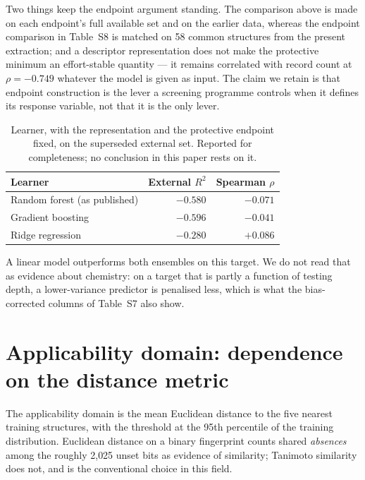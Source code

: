 \documentclass[11pt]{article}
\begin{document}
Two things keep the endpoint argument standing. The comparison above is made on
each endpoint's full available set and on the earlier data, whereas the endpoint
comparison in Table~S8 is matched on 58 common structures from the present
extraction; and a descriptor representation does not
make the protective minimum an effort-stable quantity --- it remains correlated
with record count at $\rho=-0.749$ whatever the model is given as input. The
claim we retain is that endpoint construction is the lever a screening programme
controls when it defines its response variable, not that it is the only lever.

\begin{table}[h]
\centering
\caption{Learner, with the representation and the protective endpoint fixed, on
the superseded external set. Reported for completeness; no conclusion in this
paper rests on it.}
\small
\begin{tabular}{lrr}
\toprule
Learner & External $R^2$ & Spearman $\rho$ \\
\midrule
Random forest (as published) & $-0.580$ & $-0.071$ \\
Gradient boosting & $-0.596$ & $-0.041$ \\
Ridge regression & $-0.280$ & $+0.086$ \\
\bottomrule
\end{tabular}
\end{table}

A linear model outperforms both ensembles on this target. We do not read that as
evidence about chemistry: on a target that is partly a function of testing
depth, a lower-variance predictor is penalised less, which is what the
bias-corrected columns of Table~S7 also show.

\section{Applicability domain: dependence on the distance metric}

The applicability domain is the mean Euclidean distance to the five nearest
training structures, with the threshold at the 95th percentile of the training
distribution. Euclidean distance on a binary fingerprint counts shared
\emph{absences} among the roughly 2{,}025 unset bits as evidence of similarity;
Tanimoto similarity does not, and is the conventional choice in this field.
\end{document}
